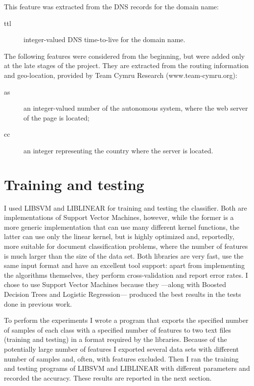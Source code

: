 \documentclass{article}
\begin{document}
This feature was extracted from the DNS records for the domain name:
\begin{description}
\item[ttl] integer-valued DNS time-to-live for the domain name.
\end{description}

The following features were considered from the beginning, but were
added only at the late stages of the project. They are extracted from
the routing information and geo-location, provided by Team Cymru
Research (www.team-cymru.org):

\begin{description}
\item[as] an integer-valued number of the autonomous system, where the
  web server of the page is located;

\item[cc] an integer representing the country where the server is located.
\end{description}

\section{Training and testing}
\label{sec:learning}

I used LIBSVM and LIBLINEAR for training and testing the
classifier. Both are implementations of Support Vector Machines,
however, while the former is a more generic implementation that can
use many different kernel functions, the latter can use only the
linear kernel, but is highly optimized and, reportedly, more suitable
for document classification problems, where the number of features is
much larger than the size of the data set. Both libraries are very
fast, use the same input format and have an excellent tool support:
apart from implementing the algorithms themselves, they perform
cross-validation and report error rates. I chose to use Support Vector
Machines because they ---along with Boosted Decision Trees and
Logistic Regression--- produced the best results in the tests done in
previous work. 

To perform the experiments I wrote a program that exports the
specified number of samples of each class with a specified number of
features to two text files (training and testing) in a format required
by the libraries. Because of the potentially large number of features
I exported several data sets with different number of samples and,
often, with features excluded. Then I ran the training and testing
programs of LIBSVM and LIBLINEAR with different parameters and
recorded the accuracy. These results are reported in the next section.
\end{document}
